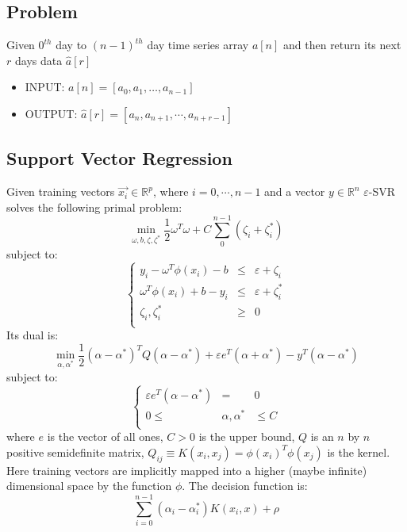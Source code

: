 \documentclass[a0b,portrait]{a0poster}
\begin{document}
\begin{multicols}{3}
\subsection*{Problem}
Given $0^{th}$ day to $\left(n - 1\right)^{th}$ day time series array $a\left[n\right]$ and then return its next $r$ days data $\hat{a}\left[r\right]$
\begin{itemize}
\item INPUT: $a\left[n\right] = \left[a_0, a_1, …, a_{n - 1}\right]$
\item OUTPUT: $\hat{a}\left[r\right] = \left[a_{n}, a_{n + 1}, \cdots, a_{n + r - 1}\right]$
\end{itemize}
\subsection*{Support Vector Regression}
Given training vectors $\vec{x_i} \in \mathbb{R}^p$, where $i = 0, \cdots, n - 1$ and a vector $y \in \mathbb{R}^n$ $\varepsilon$-SVR solves the following primal problem:
\begin{equation}
\min\limits_{\omega, b, \zeta, \zeta^*}\dfrac{1}{2}\omega^T\omega + C \sum \limits_{0}^{n - 1}{\left(\zeta_i + \zeta_i^*\right)}
\end{equation}
subject to:
\begin{equation}
\left\{
\begin{array}{rcl}
y_i - \omega^T\phi\left(x_i\right) - b & \le & \varepsilon + \zeta_i\\
\omega^T\phi\left(x_i\right) + b - y_i & \le & \varepsilon + \zeta_i^*\\
\zeta_i, \zeta_i^* & \ge & 0\\
\end{array}
\right.
\end{equation}
Its dual is:
\begin{equation}
\min\limits_{\alpha, \alpha^*}\dfrac{1}{2}\left(\alpha - \alpha^*\right)^T Q\left(\alpha - \alpha^*\right) + \varepsilon e^T \left(\alpha + \alpha^*\right) - y ^ T \left(\alpha - \alpha^*\right)
\end{equation}
subject to:
\begin{equation}
\left\{
\begin{array}{rcl}
\varepsilon e^T \left(\alpha - \alpha^*\right) & = & 0\\
0 \le & \alpha, \alpha^* & \le C\\
\end{array}
\right.
\end{equation}
where $e$ is the vector of all ones, $C > 0$ is the upper bound, $Q$ is an $n$ by $n$ positive semidefinite matrix,
$Q_{ij} \equiv K\left(x_i, x_j\right) = \phi \left(x_i\right)^T \phi \left(x_j\right)$ is the kernel. Here training vectors are implicitly mapped into a higher (maybe infinite) dimensional space by the function $\phi$.
The decision function is:
\begin{equation}
\sum_{i=0}^{n-1} \left(\alpha_i - \alpha_i^*\right) K\left(x_i, x\right) + \rho
\end{equation}

\end{multicols}
\end{document}
